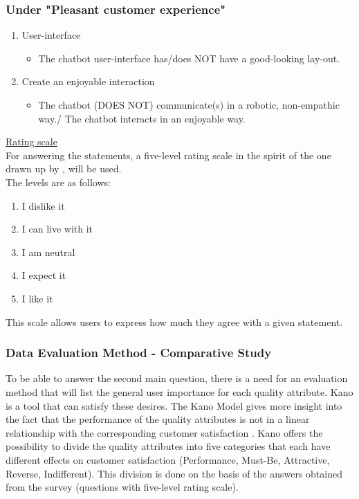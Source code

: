 \subsubsection{Under "Pleasant customer experience"}
\begin{enumerate}
	\item User-interface
	\begin{itemize}
		\item The chatbot user-interface has/does NOT have a good-looking lay-out.
	\end{itemize}
	\item Create an enjoyable interaction
	\begin{itemize}
		\item The chatbot (DOES NOT) communicate(s) in a robotic, non-empathic way./ The chatbot interacts in an enjoyable way.
	\end{itemize}
\end{enumerate}
\ul{Rating scale}\\
For answering the statements, a five-level rating scale in the spirit of the one drawn up by \citep{KANO1984}, will be used.\\
\break
The levels are as follows:\\
\begin{enumerate}
	\item I dislike it
	\item I can live with it
	\item I am neutral
	\item I expect it
	\item I like it
\end{enumerate}
This scale allows users to express how much they agree with a given statement.\\

\subsubsection{Data Evaluation Method - Comparative Study}
To be able to answer the second main question, there is a need for an evaluation method that will list the general user importance for each quality attribute. Kano is a tool that can satisfy these desires. The Kano Model gives more insight into the fact that the performance of the quality attributes is not in a linear relationship with the corresponding customer satisfaction \citep{KANO1984}. Kano offers the possibility to divide the quality attributes into five categories that each have different effects on customer satisfaction (Performance, Must-Be, Attractive, Reverse, Indifferent). This division is done on the basis of the answers obtained from the survey (questions with five-level rating scale).\\

